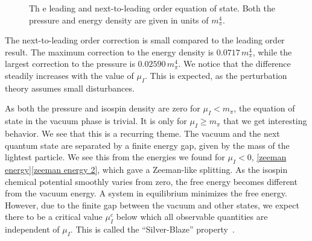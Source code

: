 \begin{figure}[h]
    \centering
    \caption{Th e leading and next-to-leading order equation of state. Both the pressure and energy density are given in units of $m_\pi^4$.}
    \label{fig:equation of state}
\end{figure}


The next-to-leading order correction is small compared to the leading order result.
The maximum correction to the energy density is $0.0717 \, m_\pi^4$, while the largest correction to the pressure is $0.02590\, m_\pi^4$.
We notice that the difference steadily increases with the value of $\mu_I$.
This is expected, as the perturbation theory assumes small disturbances.

As both the pressure and isospin density are zero for $\mu_I < m_\pi$, the equation of state in the vacuum phase is trivial.
It is only for $\mu_I \geq m_\pi$ that we get interesting behavior.
We see that this is a recurring theme.
The vacuum and the next quantum state are separated by a finite energy gap, given by the mass of the lightest particle.
We see this from the energies we found for $\mu_I < 0$, \autoref{zeeman energy}\autoref{zeeman energy 2}, which gave a Zeeman-like splitting.
As the isospin chemical potential smoothly varies from zero, the free energy becomes different from the vacuum energy.
A system in equilibrium minimizes the free energy. 
However, due to the finite gap between the vacuum and other states, we expect there to be a critical value $\mu_I^c$ below which all observable quantities are independent of $\mu_I$.
This is called the ``Silver-Blaze'' property~\autocite{cohenQCDInequalitiesNucleon2003,gunkelMesonsFiniteChemical2020}.

